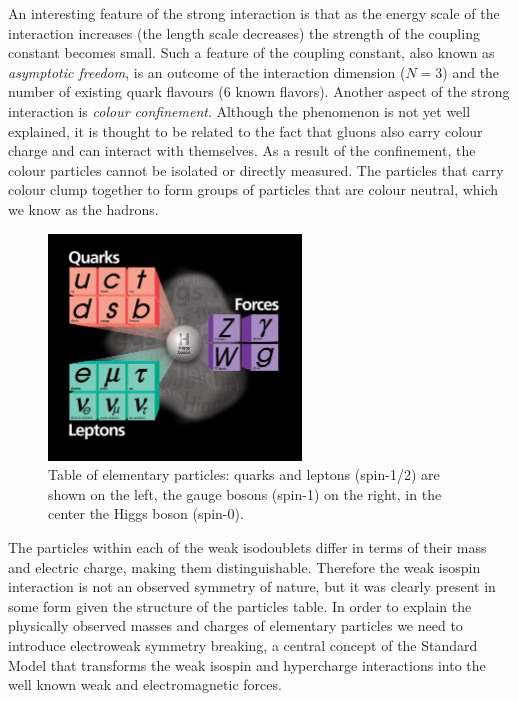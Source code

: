 An interesting feature of the strong interaction is that as the energy scale of the interaction 
increases (the length scale decreases) the strength of the coupling constant becomes small.
Such a feature of the coupling constant,
 also known as {\it asymptotic freedom},
 is an outcome of the interaction dimension ($N=3$) and the number of existing
quark flavours ($6$ known flavors).
 Another aspect of the strong interaction is {\it colour
confinement}. Although the phenomenon is not yet well explained, it is thought to be
 related to the fact that gluons also carry colour charge and can interact
with themselves. As a result of the confinement, the colour particles 
cannot be isolated or directly measured. The particles that carry colour
 clump together to form groups of particles that are colour neutral, which we know as the hadrons.

\begin{figure}
\centering
\includegraphics[width=0.6\textwidth]{plots/intro/Higgs_SM.jpeg}
\caption{Table of elementary particles: quarks and leptons (spin-1/2) are shown on the left,
the gauge bosons (spin-1) on the right, in the center the Higgs boson (spin-0).
\label{fig:parttable}}

\end{figure}

The particles within each of the weak isodoublets differ in terms of their
mass and electric charge, making them distinguishable.
 Therefore the weak isospin interaction is
 not an observed symmetry of nature, but it was clearly present
in some form given the structure of the particles table. 
In order to explain the physically observed masses and charges of elementary
 particles we need to introduce electroweak symmetry breaking, a central concept
of the Standard Model that transforms the
weak isospin and hypercharge interactions into the well known weak and electromagnetic forces.



